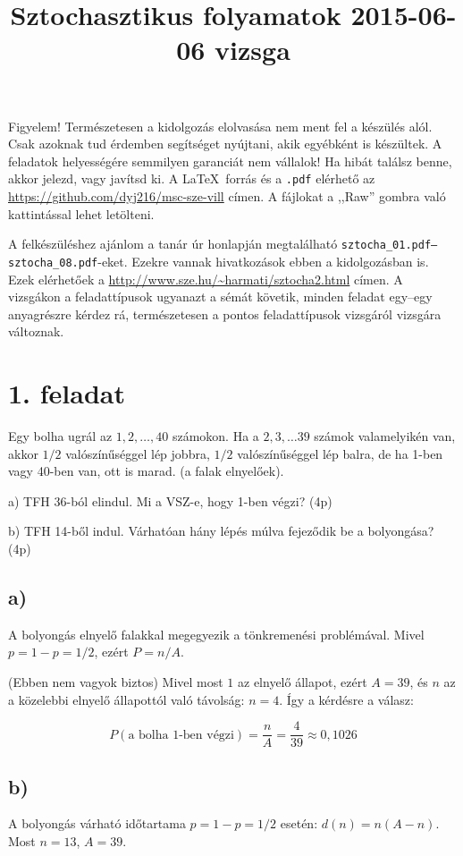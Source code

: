 \documentclass[a4paper,12pt]{article}
\title{Sztochasztikus folyamatok 2015-06-06 vizsga}
\begin{document}
\maketitle

Figyelem! Természetesen a kidolgozás elolvasása nem ment fel a készülés
alól. Csak azoknak tud érdemben segítséget nyújtani, akik egyébként is
készültek. A feladatok helyességére semmilyen garanciát nem vállalok!
Ha hibát találsz benne, akkor jelezd, vagy javítsd ki. A \LaTeX\ forrás és 
a \texttt{.pdf} elérhető az \url{https://github.com/dyj216/msc-sze-vill} 
címen. A fájlokat a ,,Raw'' gombra való kattintással lehet letölteni.

A felkészüléshez ajánlom a tanár úr honlapján megtalálható 
\texttt{\mbox{sztocha\_01.pdf}--\mbox{sztocha\_08.pdf}}-eket. Ezekre vannak hivatkozások 
ebben a kidolgozásban is. Ezek elérhetőek a 
\url{http://www.sze.hu/~harmati/sztocha2.html} címen. A vizsgákon a 
feladattípusok ugyanazt a sémát követik, minden feladat egy--egy 
anyagrészre kérdez rá, természetesen a pontos feladattípusok vizsgáról
vizsgára változnak.

\section*{1. feladat}
Egy bolha ugrál az $1,2,\dots,40$ számokon. Ha a $2,3,\dots39$ számok valamelyikén van, akkor $1/2$ valószínűséggel lép jobbra, $1/2$ valószínűséggel lép balra, de ha 1-ben vagy 40-ben van, ott is marad. (a falak elnyelőek).

a)	TFH 36-ból elindul. Mi a VSZ-e, hogy 1-ben végzi? (4p)

b)	TFH 14-ből indul. Várhatóan hány lépés múlva fejeződik be a bolyongása? (4p)

\subsection*{a)}
A bolyongás elnyelő falakkal megegyezik a tönkremenési problémával. Mivel 
$p = 1 - p = 1/2$, ezért $P = n/A$.

(Ebben nem vagyok biztos) Mivel most $1$ az elnyelő állapot, ezért $A=39$, 
és $n$ az a közelebbi elnyelő
állapottól való távolság: $n = 4$. Így a kérdésre a válasz:

\[
P(\textrm{a bolha 1-ben végzi}) = \frac{n}{A} = \frac{4}{39} \approx 0,1026 
\]

\subsection*{b)} 
A bolyongás várható időtartama $p = 1-p = 1/2$ esetén: $d(n) = n(A-n)$.
Most $n = 13$, $A = 39$.
\end{document}
